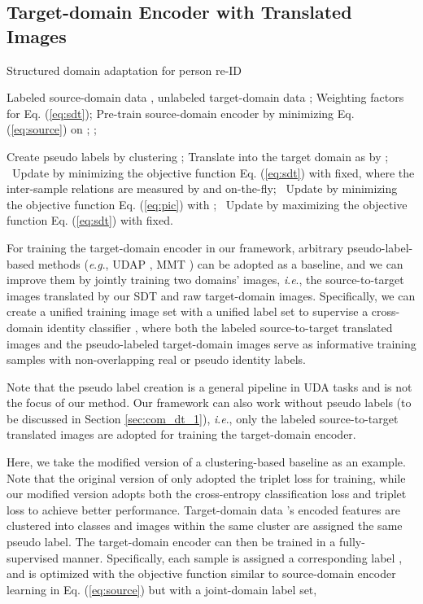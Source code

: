 \documentclass[journal]{IEEEtran}
\newcommand{\ie}{\textit{i}.\textit{e}., }
\newcommand{\eg}{\textit{e}.\textit{g}., }
\begin{document}
\subsection{Target-domain Encoder with Translated Images}
\label{sec:joint}


\begin{algorithm}[tb]
\caption{Structured domain adaptation for person re-ID}
\label{overallalg}
\footnotesize
\begin{algorithmic}[1]
\REQUIRE Labeled source-domain data , unlabeled target-domain data ;
\REQUIRE Weighting factors  for Eq. (\ref{eq:sdt});
\STATE Pre-train source-domain encoder  by minimizing Eq. (\ref{eq:source}) on ;
;

\STATE Create pseudo labels by clustering ;
\STATE Translate  into the target domain as  by ; \
\STATE Update  by minimizing the objective function Eq. (\ref{eq:sdt}) with  fixed, where the inter-sample relations are measured by  and  on-the-fly; \
\STATE Update  by minimizing the objective function Eq. (\ref{eq:pic}) with ; \
\STATE Update  by maximizing the objective function Eq. (\ref{eq:sdt}) with  fixed. \
\ENDFOR
\ENDFOR
\end{algorithmic}
\end{algorithm}



For training the target-domain encoder  in our framework,
arbitrary pseudo-label-based methods (\eg UDAP \cite{song2018unsupervised}, MMT \cite{ge2020mutual}) can be adopted as a baseline, and we can improve them by jointly training two domains' images, \ie the source-to-target images translated by our SDT and raw target-domain images.
Specifically,
we can create a unified training image set  with a unified label set to supervise a cross-domain identity classifier ,
where both the labeled source-to-target translated images  and the pseudo-labeled target-domain images  serve as informative training samples with non-overlapping real or pseudo identity labels.

Note that the pseudo label creation is a general pipeline in UDA tasks and is not the focus of our method.
Our framework can also work without pseudo labels (to be discussed in Section \ref{sec:com_dt_1}), \ie only the labeled source-to-target translated images are adopted for training the target-domain encoder.


Here, we take  {the modified version of} a clustering-based baseline \cite{song2018unsupervised} as an example.  {Note that the original version of \cite{song2018unsupervised} only adopted the triplet loss for training, while our modified version adopts both the cross-entropy classification loss and triplet loss to achieve better performance.}
Target-domain data 's encoded features  are clustered into  classes and images within the same cluster are assigned the same pseudo label.
The target-domain encoder  can then be trained in a fully-supervised manner.
Specifically,
each sample  is assigned a corresponding label , and
 is optimized with the objective function similar to source-domain encoder learning in Eq. (\ref{eq:source}) but with a joint-domain label set,
{
}
\end{document}

